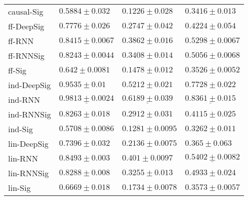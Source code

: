 \begin{tabular}{llll}
causal-Sig     &                            $ 0.5884 \pm 0.032 $ &                           $ 0.1226 \pm 0.028 $ &                           $ 0.3416 \pm 0.013 $ \\
ff-DeepSig     &                            $ 0.7776 \pm 0.026 $ &                           $ 0.2747 \pm 0.042 $ &                           $ 0.4224 \pm 0.054 $ \\
ff-RNN         &                           $ 0.8415 \pm 0.0067 $ &                           $ 0.3862 \pm 0.016 $ &                          $ 0.5298 \pm 0.0067 $ \\
ff-RNNSig      &                           $ 0.8243 \pm 0.0044 $ &                           $ 0.3408 \pm 0.014 $ &                          $ 0.5056 \pm 0.0068 $ \\
ff-Sig         &                            $ 0.642 \pm 0.0081 $ &                           $ 0.1478 \pm 0.012 $ &                          $ 0.3526 \pm 0.0052 $ \\
ind-DeepSig    &                 $  \mathbf{ 0.9535 \pm 0.01 } $ &               $  \mathbf{ 0.5212 \pm 0.021 } $ &               $  \mathbf{ 0.7728 \pm 0.022 } $ \\
ind-RNN        &  $  \mathbf{ \underline{ 0.9813 \pm 0.0024 }} $ &  $  \mathbf{ \underline{ 0.6189 \pm 0.039 }} $ &  $  \mathbf{ \underline{ 0.8361 \pm 0.015 }} $ \\
ind-RNNSig     &                            $ 0.8263 \pm 0.018 $ &                           $ 0.2912 \pm 0.031 $ &                           $ 0.4115 \pm 0.025 $ \\
ind-Sig        &                           $ 0.5708 \pm 0.0086 $ &                          $ 0.1281 \pm 0.0095 $ &                           $ 0.3262 \pm 0.011 $ \\
lin-DeepSig    &                            $ 0.7396 \pm 0.032 $ &                          $ 0.2136 \pm 0.0075 $ &                            $ 0.365 \pm 0.063 $ \\
lin-RNN        &                            $ 0.8493 \pm 0.003 $ &                           $ 0.401 \pm 0.0097 $ &           $  \underline{ 0.5402 \pm 0.0082 } $ \\
lin-RNNSig     &                            $ 0.8288 \pm 0.008 $ &                           $ 0.3255 \pm 0.013 $ &                           $ 0.4933 \pm 0.024 $ \\
lin-Sig        &                            $ 0.6669 \pm 0.018 $ &                          $ 0.1734 \pm 0.0078 $ &                          $ 0.3573 \pm 0.0057 $ \\

\end{tabular}
